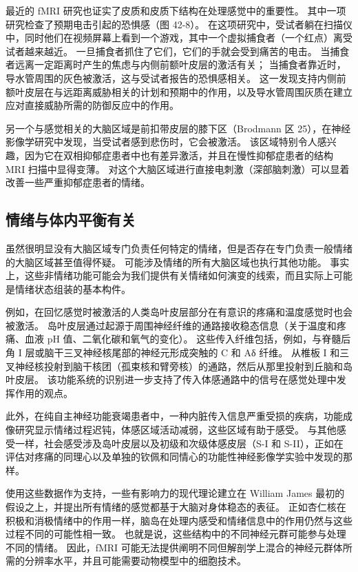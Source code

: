最近的 fMRI 研究也证实了皮质和皮质下结构在处理感觉中的重要性。 其中一项研究检查了预期电击引起的恐惧感（图 42-8）。 在这项研究中，受试者躺在扫描仪中，同时他们在视频屏幕上看到一个游戏，其中一个虚拟捕食者（一个红点）离受试者越来越近。 一旦捕食者抓住了它们，它们的手就会受到痛苦的电击。 当捕食者远离一定距离时产生的焦虑与内侧前额叶皮层的激活有关； 当捕食者靠近时，导水管周围的灰色被激活，这与受试者报告的恐惧感相关。 这一发现支持内侧前额叶皮层在与远距离威胁相关的计划和预期中的作用，以及导水管周围灰质在建立应对直接威胁所需的防御反应中的作用。

另一个与感觉相关的大脑区域是前扣带皮层的膝下区（Brodmann 区 25），在神经影像学研究中发现，当受试者感到悲伤时，它会被激活。 该区域特别令人感兴趣，因为它在双相抑郁症患者中也有差异激活，并且在慢性抑郁症患者的结构 MRI 扫描中显得变薄。 对这个大脑区域进行直接电刺激（深部脑刺激）可以显着改善一些严重抑郁症患者的情绪。

\subsection{情绪与体内平衡有关}
虽然很明显没有大脑区域专门负责任何特定的情绪，但是否存在专门负责一般情绪的大脑区域甚至值得怀疑。 可能涉及情绪的所有大脑区域也执行其他功能。 事实上，这些非情绪功能可能会为我们提供有关情绪如何演变的线索，而且实际上可能是情绪状态组装的基本构件。

例如，在回忆感觉时被激活的人类岛叶皮层部分在有意识的疼痛和温度感觉时也会被激活。 岛叶皮层通过起源于周围神经纤维的通路接收稳态信息（关于温度和疼痛、血液 pH 值、二氧化碳和氧气的变化）。 这些传入纤维包括，例如，与脊髓后角 I 层或脑干三叉神经核尾部的神经元形成突触的 C 和 Aδ 纤维。 从椎板 I 和三叉神经核投射到脑干核团（孤束核和臂旁核）的通路，然后从那里投射到丘脑和岛叶皮层。 该功能系统的识别进一步支持了传入体感通路中的信号在感觉处理中发挥作用的观点。

此外，在纯自主神经功能衰竭患者中，一种内脏传入信息严重受损的疾病，功能成像研究显示情绪过程迟钝，体感区域活动减弱，这些区域有助于感受。 与其他感受一样，社会感受涉及岛叶皮层以及初级和次级体感皮层（S-I 和 S-II），正如在评估对疼痛的同理心以及单独的钦佩和同情心的功能性神经影像学实验中发现的那样。

使用这些数据作为支持，一些有影响力的现代理论建立在 William James 最初的假设之上，并提出所有情绪的感觉都基于大脑对身体稳态的表征。 正如杏仁核在积极和消极情绪中的作用一样，脑岛在处理内感受和情绪信息中的作用仍然与这些过程不同的可能性相一致。 也就是说，这些结构中的不同神经元群可能参与处理不同的情绪。 因此，fMRI 可能无法提供阐明不同但解剖学上混合的神经元群体所需的分辨率水平，并且可能需要动物模型中的细胞技术。

